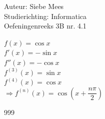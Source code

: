 \documentclass[a4paper]{article}
\begin{document}
  
\noindent \large Auteur: Siebe Mees \\
\noindent \large Studierichting: Informatica\\
\noindent \large Oefeningenreeks 3B nr. 4.1\\

\medskip

\normalsize

$f(x)=\cos x$\\

$f'(x)=-\sin x$\\

$f''(x)=-\cos x$\\

$f^{(3)}(x)=\sin x$\\

$f^{(4)}(x)=\cos x$\\

$ \Rightarrow f^{(n)}(x)=\cos\left(x+\dfrac{n\pi}{2}\right)$\\

\begin{thebibliography}{999}
\end{thebibliography}
\end{document}
